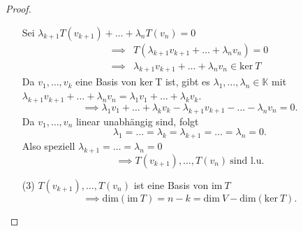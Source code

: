 \begin{proof}
\begin{enumerate}
        Sei $\lambda_{k+1}T(v_{k+1}) + \dots + \lambda_n T(v_n) = 0$
        \begin{align*}
            \implies &T(\lambda_{k+1}v_{k+1}+\dots +\lambda_nv_n) = 0\\
            \implies &\lambda_{k+1}v_{k+1} + \dots + \lambda_n v_n \in \mathrm{ker}\ T
        \end{align*}
        Da $v_1,\dots,v_k$ eine Basis von $\mathrm{ker}\ $T ist, gibt es 
        $\lambda_1,\dots,\lambda_n\in \mathbb{K}$ mit\\
        $\lambda_{k+1}v_{k+1} + \dots + \lambda_nv_n = \lambda_1 v_1 + \dots + \lambda_k v_k$.
        \[
            \implies \lambda_1v_1 + \dots + \lambda_kv_k - \lambda_{k+1}v_{k+1} - \dots - \lambda_n v_n = 0    
        .\]
        Da $v_1,\dots,v_n$ linear unabhängig sind, folgt
        \[
            \lambda_1 = \dots = \lambda_k = \lambda_{k+1} = \dots = \lambda_n = 0   
        .\]
        Also speziell $\lambda_{k+1} = \dots = \lambda_n = 0$
        \[
            \implies T(v_{k+1}),\dots,T(v_n)\ \text{sind l.u.}
        \]
        \item[(3)] $T(v_{k+1}),\dots,T(v_n)$ ist eine Basis von $\mathrm{im}\ T$
        \[
            \implies \mathrm{dim}(\mathrm{im}\ T) = n-k = \mathrm{dim}\ V - \mathrm{dim}(\mathrm{ker}\ T)    
        .\]
    \end{enumerate} 
\end{proof}